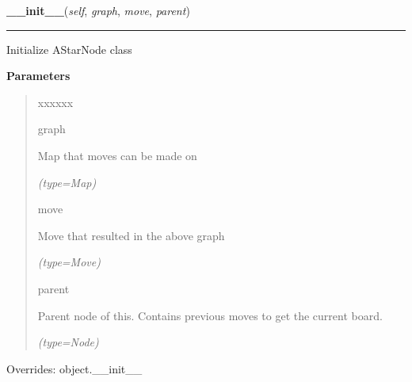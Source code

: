 \hspace{.8\funcindent}\begin{boxedminipage}{\funcwidth}

    \raggedright \textbf{\_\_init\_\_}(\textit{self}, \textit{graph}, \textit{move}, \textit{parent})

    \vspace{-1.5ex}

    \rule{\textwidth}{0.5\fboxrule}
\setlength{\parskip}{2ex}
    Initialize AStarNode class

\setlength{\parskip}{1ex}
      \textbf{Parameters}
      \vspace{-1ex}

      \begin{quote}
        \begin{Ventry}{xxxxxx}

          \item[graph]

          Map that moves can be made on

            {\it (type=Map)}

          \item[move]

          Move that resulted in the above graph

            {\it (type=Move)}

          \item[parent]

          Parent node of this. Contains previous moves to get the current 
          board.

            {\it (type=Node)}

        \end{Ventry}

      \end{quote}

      Overrides: object.\_\_init\_\_

    \end{boxedminipage}

    \label{UnBlockMeSolver:PathFinder:Node:Node:reconstructPath}

    \vspace{0.5ex}

